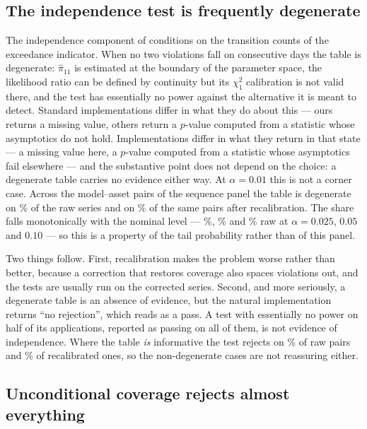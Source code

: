 \documentclass[preprint,11pt,authoryear]{elsarticle}
\newcommand{\1}{\boldsymbol{1}}
\begin{document}
\subsection{The independence test is frequently degenerate}
\label{sec:blindspot_cc}

The independence component of \citet{christoffersen1998} conditions on the
transition counts of the exceedance indicator. When no two violations fall on
consecutive days the table is degenerate: $\hat\pi_{11}$ is estimated at the
boundary of the parameter space, the likelihood ratio can be defined by
continuity but its $\chi^2_1$ calibration is not valid there, and the test has
essentially no power against the alternative it is meant to detect. Standard
implementations differ in what they do about this --- ours returns a missing
value, others return a $p$-value computed from a statistic whose asymptotics do
not hold. Implementations differ in what they return in that state --- a missing
value here, a $p$-value computed from a statistic whose asymptotics fail
elsewhere --- and the substantive point does not depend on the choice: a
degenerate table carries no evidence either way. At $\alpha = 0.01$ this is not a
corner case. Across the \nSeqPairs{} model--asset pairs of the sequence panel the
table is degenerate on \nSeqCCUndefRawOne\% of the raw series and on
\nSeqCCUndefCorOne\% of the same pairs after recalibration. The share falls
monotonically with the nominal level --- \nSeqCCUndefRawTwoFive\%,
\nSeqCCUndefRawFive\% and \nSeqCCUndefRawTen\% raw at $\alpha = 0.025$, $0.05$
and $0.10$ --- so this is a property of the tail probability rather than of this
panel.

Two things follow. First, recalibration makes the problem worse rather than
better, because a correction that restores coverage also spaces violations out,
and the tests are usually run on the corrected series. Second, and more
seriously, a degenerate table is an absence of evidence, but the natural
implementation returns ``no rejection'', which reads as a pass. A test with
essentially no power on half of its applications, reported as passing on all of
them, is not evidence of independence. Where the table \emph{is} informative the
test rejects on \nSeqCCRejRawOne\% of raw pairs and \nSeqCCRejCorOne\% of
recalibrated ones, so the non-degenerate cases are not reassuring either.

\subsection{Unconditional coverage rejects almost everything}
\label{sec:blindspot_kupiec}
\end{document}
